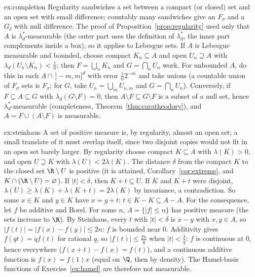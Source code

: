 \begin{solution}{ex:completion}
\idea Regularity sandwiches a set between a compact (or closed) set and an open set with small difference; countably many sandwiches give an $F_\sigma$ and a
$G_\delta$ with null difference.
\writeup The proof of Proposition~\ref{prop:regularity} used only that $A$ is $\lambda_d^*$-measurable (the outer part uses the definition of $\lambda_d^*$, the inner part
complements inside a box), so it applies to Lebesgue sets. If $A$ is Lebesgue measurable and bounded, choose compact $K_n\subseteq A$ and open $U_n\supseteq A$ with
$\lambda_d(U_n\setminus K_n)<\frac1n$; then $F=\bigcup_nK_n$ and $G=\bigcap_nU_n$ work. For unbounded $A$, do this in each $A\cap\,]-m,m]^d$ with error $\frac1n2^{-m}$ and take unions (a countable union of
$F_\sigma$ sets is $F_\sigma$; for $G$, take $U_n=\bigcup_mU_{n,m}$ and $G=\bigcap_nU_n$). Conversely, if $F\subseteq A\subseteq G$ with $\lambda_d(G\setminus F)=0$, then $A\setminus F\subseteq G\setminus F$ is a subset of a null set,
hence $\lambda_d^*$-measurable (completeness, Theorem~\ref{thm:caratheodory}), and $A=F\cup(A\setminus F)$ is measurable.
\end{solution}

\begin{solution}{ex:steinhaus}
\idea A set of positive measure is, by regularity, almost an open set; a small translate of it must overlap itself, since two disjoint copies would not fit in
an open set barely larger.
\writeup By regularity choose compact $K\subseteq A$ with $\lambda(K)>0$, and open $U\supseteq K$ with $\lambda(U)<2\lambda(K)$. The distance $\delta$ from the compact $K$ to the closed set $\R\setminus U$ is positive
(it is attained, Corollary~\ref{cor:extreme}, and $K\cap(\R\setminus U)=\varnothing$). If $|t|<\delta$, then $K+t\subseteq U$. If $K$ and $K+t$ were disjoint, $\lambda(U)\ge\lambda(K)+\lambda(K+t)=2\lambda(K)$ by invariance,
a contradiction. So some $x\in K$ and $y\in K$ have $x=y+t$: $t\in K-K\subseteq A-A$.
For the consequence, let $f$ be additive and Borel. For some $n$, $A=\{|f|\le n\}$ has positive measure (the sets increase to $\R$). By Steinhaus, every $t$ with $|t|<\delta$ is
$x-y$ with $x,y\in A$, so $|f(t)|=|f(x)-f(y)|\le2n$: $f$ is bounded near $0$. Additivity gives $f(qt)=qf(t)$ for rational $q$, so $|f(t)|\le\frac{2n}q$ when $|t|<\frac\delta q$: $f$ is continuous at $0$,
hence everywhere ($f(x+t)-f(x)=f(t)$), and a continuous additive function is $f(x)=f(1)x$ (equal on $\Q$, then by density). The Hamel-basis functions of
Exercise~\ref{ex:hamel} are therefore not measurable.
\end{solution}

